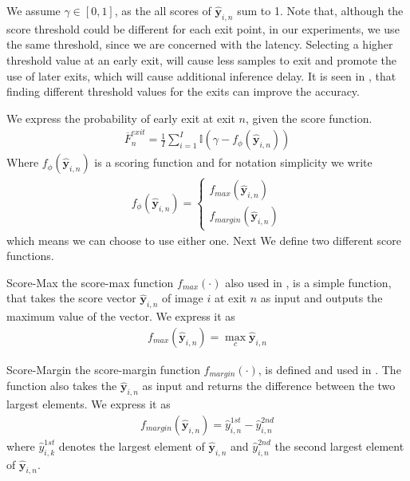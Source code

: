 \begin{enumdescript}
		We assume $	\gamma \in \left[0,1\right] $, as the all scores of  $ \bm{\hat{y}}_{i,n} $ sum to 1. Note that, although the score threshold could be different for each exit point, in our experiments, we use the same threshold, since we are concerned with the latency. Selecting a higher threshold value at an early exit, will cause less samples to exit and promote the use of later exits, which will cause additional inference delay. It is seen in \cite{teerapittayanon_finding_2018}, that finding different threshold values for the exits can improve the accuracy.
		
		We express the probability of early exit at exit $ n $, given the score function. 
		\begin{align}
		\overline{F}^{exit}_n = \frac{1}{I}\sum_{i=1}^{I} \mathbb{I} \left(\gamma-f_{\phi}\left(\bm{\hat{y}}_{i,n}\right) \right)
		\end{align}
		Where $ f_\phi\left(\bm{\hat{y}}_{i,n}\right) $ is a scoring function and for notation simplicity we write 
		\begin{align}
			f_{\phi}\left(\bm{\hat{y}}_{i,n}\right) = \begin{cases}
			 	f_{max}\left(\bm{\hat{y}}_{i,n}\right)\\
			 	f_{margin}\left(\bm{\hat{y}}_{i,n}\right)
			\end{cases}
		\end{align}
		which means we can choose to use either one. Next We define two different score functions.
		
		\begin{enumdescript}
			\item[Score-Max] the score-max function $ f_{max}(\cdot)$ also used in \cite{leroux_resource-constrained_2015}, is a simple function, that takes the score vector $ \bm{\hat{y}}_{i,n} $ of image $ i $ at exit $ n $ as input and outputs the maximum value of the vector. We express it as 
			\begin{align}
			f_{max}\left(\bm{\hat{y}}_{i,n}\right) = \underset{c}{\max} \bm{\hat{y}}_{i,n}
			\end{align}
			\item[Score-Margin] the score-margin function $ f_{margin}(\cdot)$, is defined and used in \cite{park_big/little_2015}. The function also takes the $ \bm{\hat{y}}_{i,n} $ as input and returns the difference between the two largest elements. We express it as
			\begin{align}
			f_{margin}\left(\bm{\hat{y}}_{i,n}\right) = \hat{y}_{i,n}^{1st} - \hat{y}_{i,n}^{2nd} \label{eq:f_margin}
			\end{align}
			where $ \hat{y}_{i,k}^{1st} $ denotes the largest element of $ \bm{\hat{y}}_{i,n} $ 
			and $ \hat{y}_{i,n}^{2nd} $ the second largest element of $ \bm{\hat{y}}_{i,n} $.
			

\end{enumdescript}
\end{enumdescript}

